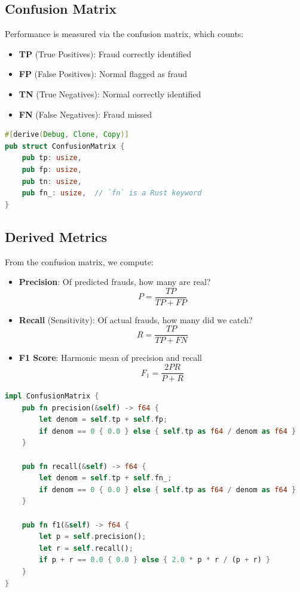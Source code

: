 \subsection{Confusion Matrix}

Performance is measured via the confusion matrix, which counts:
\begin{itemize}
    \item \textbf{TP} (True Positives): Fraud correctly identified
    \item \textbf{FP} (False Positives): Normal flagged as fraud
    \item \textbf{TN} (True Negatives): Normal correctly identified
    \item \textbf{FN} (False Negatives): Fraud missed
\end{itemize}

\begin{lstlisting}[language=Rust]
#[derive(Debug, Clone, Copy)]
pub struct ConfusionMatrix {
    pub tp: usize,
    pub fp: usize,
    pub tn: usize,
    pub fn_: usize,  // `fn` is a Rust keyword
}
\end{lstlisting}

\marginnote{%

}

\subsection{Derived Metrics}

From the confusion matrix, we compute:


\begin{itemize}
    \item \textbf{Precision}: Of predicted frauds, how many are real?
    \[P = \frac{TP}{TP + FP}\]

    \item \textbf{Recall} (Sensitivity): Of actual frauds, how many did we catch?
    \[R = \frac{TP}{TP + FN}\]

    \item \textbf{F1 Score}: Harmonic mean of precision and recall
    \[F_1 = \frac{2PR}{P + R}\]
\end{itemize}

\begin{lstlisting}[language=Rust]
impl ConfusionMatrix {
    pub fn precision(&self) -> f64 {
        let denom = self.tp + self.fp;
        if denom == 0 { 0.0 } else { self.tp as f64 / denom as f64 }
    }

    pub fn recall(&self) -> f64 {
        let denom = self.tp + self.fn_;
        if denom == 0 { 0.0 } else { self.tp as f64 / denom as f64 }
    }

    pub fn f1(&self) -> f64 {
        let p = self.precision();
        let r = self.recall();
        if p + r == 0.0 { 0.0 } else { 2.0 * p * r / (p + r) }
    }
}
\end{lstlisting}

